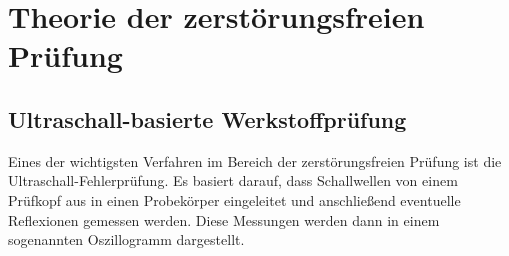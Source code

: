 \documentclass[a4paper, 10pt]{scrartcl}
\begin{document}
\section{Theorie der zerstörungsfreien Prüfung}
\subsection{Ultraschall-basierte Werkstoffprüfung}
Eines der wichtigsten Verfahren im Bereich der zerstörungsfreien Prüfung ist die Ultraschall-Fehlerprüfung. Es basiert darauf, dass Schallwellen von einem Prüfkopf aus in einen Probekörper eingeleitet und anschließend eventuelle Reflexionen gemessen werden. Diese Messungen werden dann in einem sogenannten Oszillogramm dargestellt.

\end{document}
